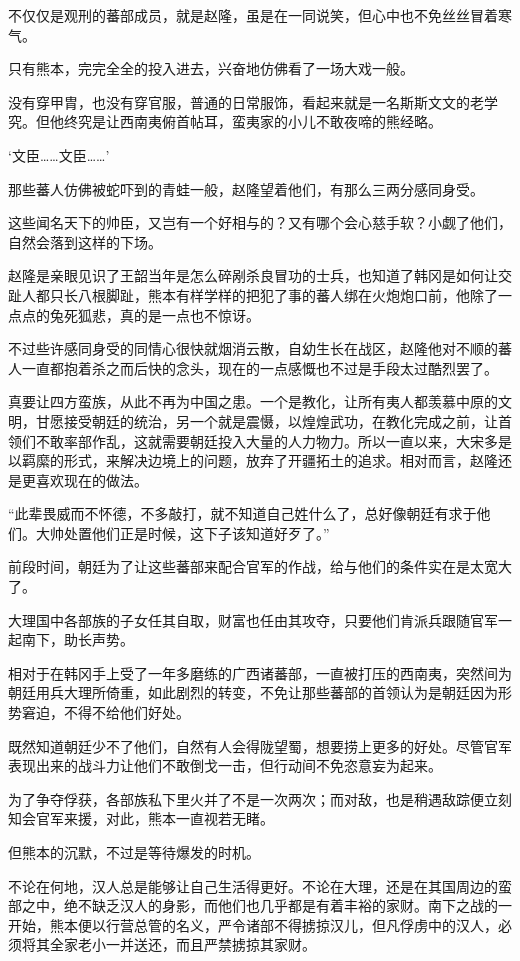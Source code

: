 不仅仅是观刑的蕃部成员，就是赵隆，虽是在一同说笑，但心中也不免丝丝冒着寒气。

只有熊本，完完全全的投入进去，兴奋地仿佛看了一场大戏一般。

没有穿甲胄，也没有穿官服，普通的日常服饰，看起来就是一名斯斯文文的老学究。但他终究是让西南夷俯首帖耳，蛮夷家的小儿不敢夜啼的熊经略。

‘文臣……文臣……’

那些蕃人仿佛被蛇吓到的青蛙一般，赵隆望着他们，有那么三两分感同身受。

这些闻名天下的帅臣，又岂有一个好相与的？又有哪个会心慈手软？小觑了他们，自然会落到这样的下场。

赵隆是亲眼见识了王韶当年是怎么碎剐杀良冒功的士兵，也知道了韩冈是如何让交趾人都只长八根脚趾，熊本有样学样的把犯了事的蕃人绑在火炮炮口前，他除了一点点的兔死狐悲，真的是一点也不惊讶。

不过些许感同身受的同情心很快就烟消云散，自幼生长在战区，赵隆他对不顺的蕃人一直都抱着杀之而后快的念头，现在的一点感慨也不过是手段太过酷烈罢了。

真要让四方蛮族，从此不再为中国之患。一个是教化，让所有夷人都羡慕中原的文明，甘愿接受朝廷的统治，另一个就是震慑，以煌煌武功，在教化完成之前，让首领们不敢率部作乱，这就需要朝廷投入大量的人力物力。所以一直以来，大宋多是以羁縻的形式，来解决边境上的问题，放弃了开疆拓土的追求。相对而言，赵隆还是更喜欢现在的做法。

“此辈畏威而不怀德，不多敲打，就不知道自己姓什么了，总好像朝廷有求于他们。大帅处置他们正是时候，这下子该知道好歹了。”

前段时间，朝廷为了让这些蕃部来配合官军的作战，给与他们的条件实在是太宽大了。

大理国中各部族的子女任其自取，财富也任由其攻夺，只要他们肯派兵跟随官军一起南下，助长声势。

相对于在韩冈手上受了一年多磨练的广西诸蕃部，一直被打压的西南夷，突然间为朝廷用兵大理所倚重，如此剧烈的转变，不免让那些蕃部的首领认为是朝廷因为形势窘迫，不得不给他们好处。

既然知道朝廷少不了他们，自然有人会得陇望蜀，想要捞上更多的好处。尽管官军表现出来的战斗力让他们不敢倒戈一击，但行动间不免恣意妄为起来。

为了争夺俘获，各部族私下里火并了不是一次两次；而对敌，也是稍遇敌踪便立刻知会官军来援，对此，熊本一直视若无睹。

但熊本的沉默，不过是等待爆发的时机。

不论在何地，汉人总是能够让自己生活得更好。不论在大理，还是在其国周边的蛮部之中，绝不缺乏汉人的身影，而他们也几乎都是有着丰裕的家财。南下之战的一开始，熊本便以行营总管的名义，严令诸部不得掳掠汉儿，但凡俘虏中的汉人，必须将其全家老小一并送还，而且严禁掳掠其家财。

